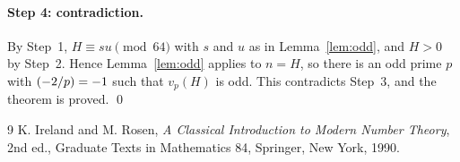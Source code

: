 \documentclass[11pt]{article}
\newcommand{\leg}[2]{\mathchoice{\biggl(\dfrac{#1}{#2}\biggr)}{(#1/#2)}{(#1/#2)}{(#1/#2)}}
\begin{document}
\paragraph{Step 4: contradiction.} By Step~1, $H\equiv su\pmod{64}$ with $s$ and $u$ as in Lemma~\ref{lem:odd}, and $H>0$ by Step~2. Hence Lemma~\ref{lem:odd} applies to $n=H$, so there is an odd prime $p$ with $\leg{-2}{p}=-1$ such that $v_p(H)$ is odd. This contradicts Step~3, and the theorem is proved.
\qed

\begin{thebibliography}{9}
 K. Ireland and M. Rosen, \emph{A Classical Introduction to Modern Number Theory}, 2nd ed., Graduate Texts in Mathematics 84, Springer, New York, 1990.
\end{thebibliography}
\end{document}
